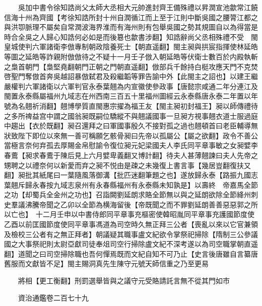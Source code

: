 　　吳加中書令徐知誥尚父太師大丞相大元帥進封齊王備殊禮以昇潤宣池歙常江饒信海十州為齊國【考徐知誥所封十州自潤循江而上至于江則中斷吳國之腰膂江都之與洪卾脈理不屬矣自常潤波海界淮而有海州則有包舉吳國之勢其規圖自以為得當是時合全吳之人歸心知誥何必如是而後簒也歙書涉翻】知誥辭尚父丞相殊禮不受　閩皇城使判六軍諸衛李倣專制朝政陰養死士【朝直遥翻】閩主昶與拱宸指揮使林延皓等圖之延皓等詐親附倣倣待之不疑十一月壬子倣入朝延皓等伏衛士數百於内殿執斬之梟首朝門【梟堅堯翻朝門正朝之門朝直遥翻】倣部兵千餘持白梃攻應天門不克焚啓聖門奪倣首奔吳越詔暴倣弑君及殺繼韜等罪告諭中外【此閩主之詔也】以建王繼嚴權判六軍諸衛以六軍判官永泰葉翹為内宣徽使參政事【唐懿宗咸通二年分連江及閩置永泰縣屬福州九域志在州西南三百五十里福州圖經云永泰縣唐永泰二年置以年號為名翹祈消翻】翹博學質直閩惠宗擢為福王友【閩主昶初封福王】昶以師傳禮待之多所禆益宫中謂之國翁昶既嗣位驕縱不與翹議國事一旦昶方視事翹衣道士服過庭中趨出【衣於既翻】昶召還拜之曰軍國事殷久不接對孤之過也翹頓首曰老臣輔導無狀致陛下即位以來無一善可稱願乞骸骨昶曰先帝以孤屬公【屬之欲翻】政令不善公當極言奈何弃孤去厚賜金帛慰諭令復位昶元妃梁國夫人李氏同平章事敏之女昶嬖李春鷰【昶求春鷰于陳后見上六月嬖卑義翻又博計翻】待夫人甚薄翹諫曰夫人先帝之甥聘之以禮奈何以新愛而弃之昶不悦由是疎之未幾復上書言事【幾居豈翻復扶又翻】昶批其紙尾曰一葉隨風落御溝【批匹迷翻筆題之也】遂放歸永泰【路振九國志葉翹斥歸永春按九域志泉州有永春縣福州有永泰縣未知孰是】以壽終　帝嘉馬全節之功【却蜀兵全金州之功也】召詣闕劉延朗求賂全節無以與之延朗欲除全節絳州刺史羣議沸騰帝聞之乙卯以全節為横海留後【帝既聞之而不罪劉延朗善善惡惡郭之所以亡也】　十二月壬申以中書侍郎同平章事充樞密使韓昭胤同平章事充護國節度使　乙酉以前匡國節度使同平章事馮道為司空時久無正拜三公者【喪亂以來以它官兼領及檢校三公者有之無正拜者】朝議疑其職事盧文紀欲令掌祭祀掃除【隋制三公參議國之大事祭祀則太尉亞獻司徒奉俎司空行掃除盧文紀不深考遂以為司空職掌朝直遥翻】道聞之曰司空掃除職也吾何憚焉既而文紀自知不可乃止【史言後唐雖自言纂唐舊服而文獻皆不足】閩主賜洞真先生陳守元號天師信重之乃至更易

　　將相【更工衡翻】刑罰選舉皆與之議守元受賂請託言無不從其門如市

　　資治通鑑卷二百七十九


    


 


 



 

 
  







